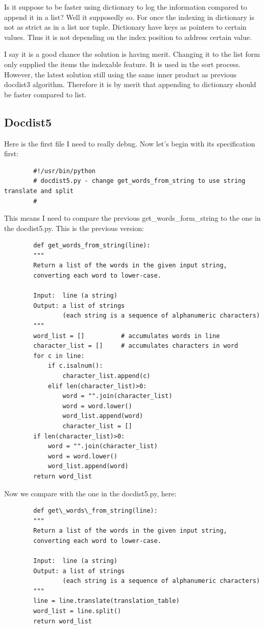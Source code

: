\documentclass{article}
\begin{document}
    Is it suppose to be faster using dictionary to log the information compared to append it in a list?
    Well it supposedly so.
    For once the indexing in dictionary is not as strict as in a list nor tuple. 
    Dictionary have keys as pointers to certain values.
    Thus it is not depending on the index position to address certain value.

    I say it is a good chance the solution is having merit. 
    Changing it to the list form only supplied the items the indexable feature.
    It is used in the sort process.
    However, the latest solution still using the same inner product as previous docdist3 algorithm.
    Therefore it is by merit that appending to dictionary should be faster compared to list.

    \subsection{Docdist5}
    Here is the first file I need to really debug. 
    Now let's begin with its specification first:
    \begin{lstlisting}
        #!/usr/bin/python
        # docdist5.py - change get_words_from_string to use string translate and split
        #
    \end{lstlisting}
    This means I need to compare the previous get\_words\_form\_string to the one in the docdist5.py.
    This is the previous version:
    \begin{lstlisting}
        def get_words_from_string(line):
        """
        Return a list of the words in the given input string,
        converting each word to lower-case.

        Input:  line (a string)
        Output: a list of strings 
                (each string is a sequence of alphanumeric characters)
        """
        word_list = []          # accumulates words in line
        character_list = []     # accumulates characters in word
        for c in line:
            if c.isalnum():
                character_list.append(c)
            elif len(character_list)>0:
                word = "".join(character_list)
                word = word.lower()
                word_list.append(word)
                character_list = []
        if len(character_list)>0:
            word = "".join(character_list)
            word = word.lower()
            word_list.append(word)
        return word_list
    \end{lstlisting}
    Now we compare with the one in the docdist5.py, here:
    \begin{lstlisting}
        def get\_words\_from_string(line):
        """
        Return a list of the words in the given input string,
        converting each word to lower-case.

        Input:  line (a string)
        Output: a list of strings 
                (each string is a sequence of alphanumeric characters)
        """
        line = line.translate(translation_table)
        word_list = line.split()
        return word_list
    \end{lstlisting}
\end{document}
